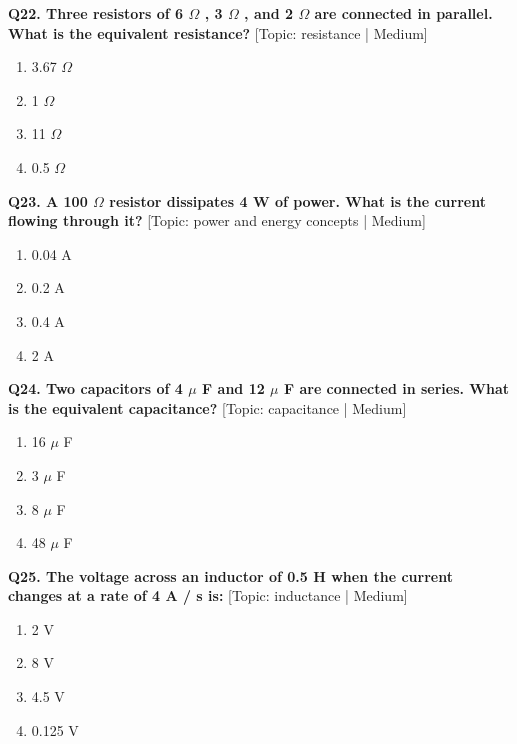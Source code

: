 \noindent\textbf{Q22. Three resistors of 6 $\Omega$ , 3 $\Omega$ , and 2 $\Omega$ are connected in parallel. What is the equivalent resistance?} \hfill [Topic: resistance | Medium]
\begin{enumerate}[label=(\alph*),topsep=2pt,itemsep=1pt,partopsep=0pt,parsep=0pt]
    \item {3.67 $\Omega$}
    \item {1 $\Omega$}
    \item {11 $\Omega$}
    \item {0.5 $\Omega$}
\end{enumerate}
\vspace{2mm}

\noindent\textbf{Q23. A 100 $\Omega$ resistor dissipates 4 W of power. What is the current flowing through it?} \hfill [Topic: power and energy concepts | Medium]
\begin{enumerate}[label=(\alph*),topsep=2pt,itemsep=1pt,partopsep=0pt,parsep=0pt]
    \item {0.04 A}
    \item {0.2 A}
    \item {0.4 A}
    \item {2 A}
\end{enumerate}
\vspace{2mm}

\noindent\textbf{Q24. Two capacitors of 4 $\mu$ F and 12 $\mu$ F are connected in series. What is the equivalent capacitance?} \hfill [Topic: capacitance | Medium]
\begin{enumerate}[label=(\alph*),topsep=2pt,itemsep=1pt,partopsep=0pt,parsep=0pt]
    \item {16 $\mu$ F}
    \item {3 $\mu$ F}
    \item {8 $\mu$ F}
    \item {48 $\mu$ F}
\end{enumerate}
\vspace{2mm}

\noindent\textbf{Q25. The voltage across an inductor of 0.5 H when the current changes at a rate of 4 A / s is:} \hfill [Topic: inductance | Medium]
\begin{enumerate}[label=(\alph*),topsep=2pt,itemsep=1pt,partopsep=0pt,parsep=0pt]
    \item {2 V}
    \item {8 V}
    \item {4.5 V}
    \item {0.125 V}
\end{enumerate}
\vspace{2mm}

